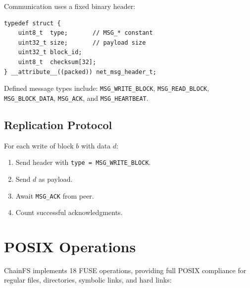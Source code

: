 \documentclass[10pt,twocolumn]{article}
\begin{document}
Communication uses a fixed binary header:

\begin{lstlisting}[caption={Network message header}]
typedef struct {
    uint8_t  type;       // MSG_* constant
    uint32_t size;       // payload size
    uint32_t block_id;
    uint8_t  checksum[32];
} __attribute__((packed)) net_msg_header_t;
\end{lstlisting}

Defined message types include:
\texttt{MSG\_WRITE\_BLOCK},
\texttt{MSG\_READ\_BLOCK},
\texttt{MSG\_BLOCK\_DATA},
\texttt{MSG\_ACK}, and
\texttt{MSG\_HEARTBEAT}.

\subsection{Replication Protocol}

For each write of block $b$ with data $d$:

\begin{enumerate}[leftmargin=*, label=\arabic*.]
    \item Send header with
    \texttt{type = MSG\_WRITE\_BLOCK}.
    \item Send $d$ as payload.
    \item Await \texttt{MSG\_ACK}
    from peer.
    \item Count successful
    acknowledgments.
\end{enumerate}

\section{POSIX Operations}

ChainFS implements 18 FUSE operations,
providing full POSIX compliance for
regular files, directories,
symbolic links, and hard links:
\end{document}
